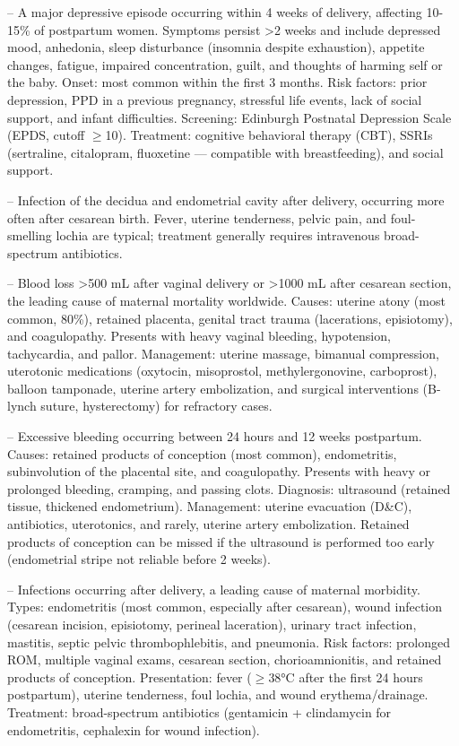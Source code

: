 -- A major depressive episode occurring within 4 weeks of delivery, affecting 10-15\% of postpartum women. Symptoms persist >2 weeks and include depressed mood, anhedonia, sleep disturbance (insomnia despite exhaustion), appetite changes, fatigue, impaired concentration, guilt, and thoughts of harming self or the baby. Onset: most common within the first 3 months. Risk factors: prior depression, PPD in a previous pregnancy, stressful life events, lack of social support, and infant difficulties. Screening: Edinburgh Postnatal Depression Scale (EPDS, cutoff \(\ge\)10). Treatment: cognitive behavioral therapy (CBT), SSRIs (sertraline, citalopram, fluoxetine — compatible with breastfeeding), and social support.

-- Infection of the decidua and endometrial cavity after delivery, occurring more often after cesarean birth. Fever, uterine tenderness, pelvic pain, and foul-smelling lochia are typical; treatment generally requires intravenous broad-spectrum antibiotics.

-- Blood loss >500 mL after vaginal delivery or >1000 mL after cesarean section, the leading cause of maternal mortality worldwide. Causes: uterine atony (most common, 80\%), retained placenta, genital tract trauma (lacerations, episiotomy), and coagulopathy. Presents with heavy vaginal bleeding, hypotension, tachycardia, and pallor. Management: uterine massage, bimanual compression, uterotonic medications (oxytocin, misoprostol, methylergonovine, carboprost), balloon tamponade, uterine artery embolization, and surgical interventions (B-lynch suture, hysterectomy) for refractory cases.

-- Excessive bleeding occurring between 24 hours and 12 weeks postpartum. Causes: retained products of conception (most common), endometritis, subinvolution of the placental site, and coagulopathy. Presents with heavy or prolonged bleeding, cramping, and passing clots. Diagnosis: ultrasound (retained tissue, thickened endometrium). Management: uterine evacuation (D\&C), antibiotics, uterotonics, and rarely, uterine artery embolization. Retained products of conception can be missed if the ultrasound is performed too early (endometrial stripe not reliable before 2 weeks).

-- Infections occurring after delivery, a leading cause of maternal morbidity. Types: endometritis (most common, especially after cesarean), wound infection (cesarean incision, episiotomy, perineal laceration), urinary tract infection, mastitis, septic pelvic thrombophlebitis, and pneumonia. Risk factors: prolonged ROM, multiple vaginal exams, cesarean section, chorioamnionitis, and retained products of conception. Presentation: fever (\(\ge\)38°C after the first 24 hours postpartum), uterine tenderness, foul lochia, and wound erythema/drainage. Treatment: broad-spectrum antibiotics (gentamicin + clindamycin for endometritis, cephalexin for wound infection).

